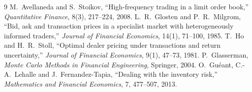 \documentclass[10pt,a4paper]{article}
\newcommand{\1}{\mathbf{1}}
\begin{document}
\vspace{2pt}
{\small
\begin{thebibliography}{9}
\setlength{\itemsep}{0pt}
M.~Avellaneda and S.~Stoikov, ``High-frequency trading in a limit order book,''
\emph{Quantitative Finance}, 8(3), 217--224, 2008.
L.~R.~Glosten and P.~R.~Milgrom, ``Bid, ask and transaction prices in a specialist
market with heterogeneously informed traders,'' \emph{Journal of Financial Economics},
14(1), 71--100, 1985.
T.~Ho and H.~R.~Stoll, ``Optimal dealer pricing under transactions and return
uncertainty,'' \emph{Journal of Financial Economics}, 9(1), 47--73, 1981.
P.~Glasserman, \emph{Monte Carlo Methods in Financial Engineering}, Springer, 2004.
O.~Gu\'eant, C.-A.~Lehalle and J.~Fernandez-Tapia, ``Dealing with the inventory risk,''
\emph{Mathematics and Financial Economics}, 7, 477--507, 2013.
\end{thebibliography}
}
\end{document}
